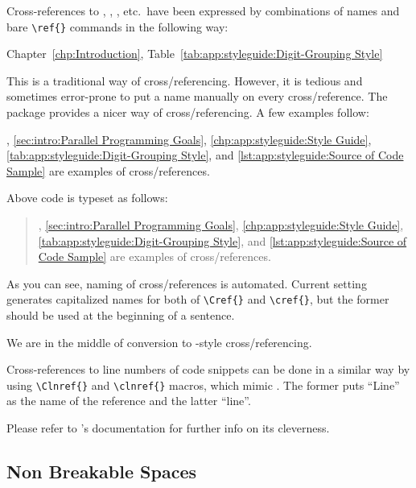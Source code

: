 Cross-references to ,
,
, etc.\ have
been expressed by combinations of names and bare \verb|\ref{}|
commands in the following way:

\begin{VerbatimN}
Chapter~\ref{chp:Introduction},
Table~\ref{tab:app:styleguide:Digit-Grouping Style}
\end{VerbatimN}

This is a traditional way of cross\-/referencing.
However, it is tedious and sometimes error-prone to put a name
manually on every cross\-/reference.
The  package provides a nicer way of cross\-/referencing.
A few examples follow:

\begin{VerbatimN}
,
\cref{sec:intro:Parallel Programming Goals},
\cref{chp:app:styleguide:Style Guide},
\cref{tab:app:styleguide:Digit-Grouping Style}, and
\cref{lst:app:styleguide:Source of Code Sample} are
examples of cross\-/references.
\end{VerbatimN}

Above code is typeset as follows:

\begin{quote}
,
\cref{sec:intro:Parallel Programming Goals},
\cref{chp:app:styleguide:Style Guide},
\cref{tab:app:styleguide:Digit-Grouping Style}, and
\cref{lst:app:styleguide:Source of Code Sample} are
examples of cross\-/references.
\end{quote}

As you can see, naming of cross\-/references is automated.
Current setting generates capitalized names for both of
\verb|\Cref{}| and \verb|\cref{}|, but the former
should be used at the beginning of a sentence.

We are in the middle of conversion to
-style cross\-/referencing.

Cross-references to line numbers of code snippets
can be done in a similar way by using \verb|\Clnref{}| and
\verb|\clnref{}| macros, which mimic .
The former puts ``Line'' as the name of the reference
and the latter ``line''.

Please refer to 's documentation for further
info on its cleverness.

\subsection{Non Breakable Spaces}
\label{sec:app:styleguide:Non Breakable Spaces}

